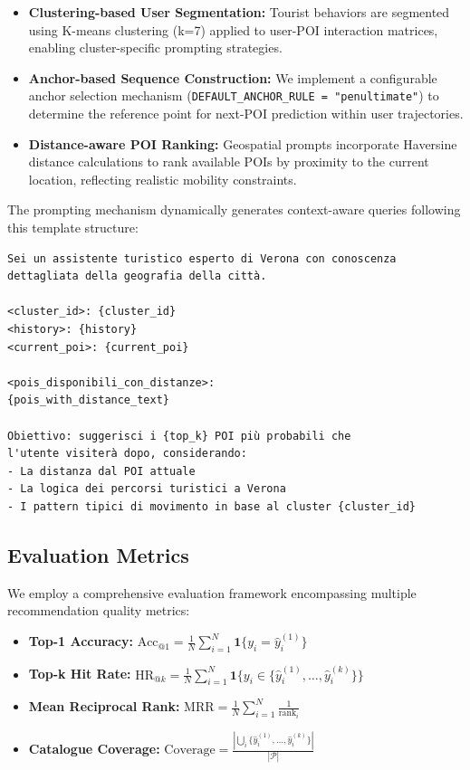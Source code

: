 \documentclass[12pt,a4paper]{article}
\begin{document}
\begin{itemize}
\item \textbf{Clustering-based User Segmentation:} Tourist behaviors are segmented using K-means clustering (k=7) applied to user-POI interaction matrices, enabling cluster-specific prompting strategies.
\item \textbf{Anchor-based Sequence Construction:} We implement a configurable anchor selection mechanism (\texttt{DEFAULT\_ANCHOR\_RULE = "penultimate"}) to determine the reference point for next-POI prediction within user trajectories.
\item \textbf{Distance-aware POI Ranking:} Geospatial prompts incorporate Haversine distance calculations to rank available POIs by proximity to the current location, reflecting realistic mobility constraints.
\end{itemize}

The prompting mechanism dynamically generates context-aware queries following this template structure:

\begin{lstlisting}[language=text, caption=Comprehensive Context Prompt Template]
Sei un assistente turistico esperto di Verona con conoscenza 
dettagliata della geografia della città.

<cluster_id>: {cluster_id}
<history>: {history}
<current_poi>: {current_poi}

<pois_disponibili_con_distanze>:
{pois_with_distance_text}

Obiettivo: suggerisci i {top_k} POI più probabili che 
l'utente visiterà dopo, considerando:
- La distanza dal POI attuale
- La logica dei percorsi turistici a Verona
- I pattern tipici di movimento in base al cluster {cluster_id}
\end{lstlisting}

\subsection{Evaluation Metrics}

We employ a comprehensive evaluation framework encompassing multiple recommendation quality metrics:

\begin{itemize}
\item \textbf{Top-1 Accuracy:} $\text{Acc}_{@1} = \frac{1}{N}\sum_{i=1}^{N}\mathbf{1}\{y_i = \hat{y}_i^{(1)}\}$
\item \textbf{Top-k Hit Rate:} $\text{HR}_{@k} = \frac{1}{N}\sum_{i=1}^{N}\mathbf{1}\{y_i \in \{\hat{y}_i^{(1)}, \ldots, \hat{y}_i^{(k)}\}\}$
\item \textbf{Mean Reciprocal Rank:} $\text{MRR} = \frac{1}{N}\sum_{i=1}^{N}\frac{1}{\text{rank}_i}$
\item \textbf{Catalogue Coverage:} $\text{Coverage} = \frac{|\bigcup_{i}\{\hat{y}_i^{(1)}, \ldots, \hat{y}_i^{(k)}\}|}{|\mathcal{P}|}$
\end{itemize}
\end{document}
